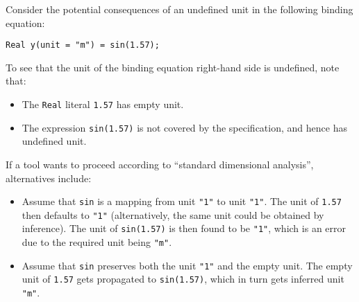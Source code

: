 \begin{example}
Consider the potential consequences of an undefined unit in the following binding equation:
\begin{lstlisting}[language=modelica]
Real y(unit = "m") = sin(1.57);
\end{lstlisting}
To see that the unit of the binding equation right-hand side is undefined, note that:
\begin{itemize}
\item The \lstinline!Real! literal \lstinline!1.57! has empty unit.
\item The expression \lstinline!sin(1.57)! is not covered by the specification, and hence has undefined unit.
\end{itemize}
If a tool wants to proceed according to ``standard dimensional analysis'', alternatives include:
\begin{itemize}
\item
  Assume that \lstinline!sin! is a mapping from unit \lstinline!"1"! to unit \lstinline!"1"!.
  The unit of \lstinline!1.57! then defaults to \lstinline!"1"! (alternatively, the same unit could be obtained by inference).
  The unit of \lstinline!sin(1.57)! is then found to be \lstinline!"1"!, which is an error due to the required unit being \lstinline!"m"!.
\item
  Assume that \lstinline!sin! preserves both the unit \lstinline!"1"! and the empty unit.
  The empty unit of \lstinline!1.57! gets propagated to \lstinline!sin(1.57)!, which in turn gets inferred unit \lstinline!"m"!.
\end{itemize}
\end{example}
